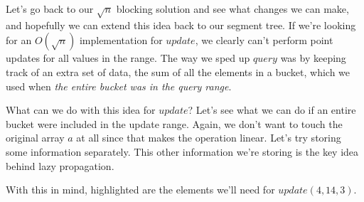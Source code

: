 \documentclass[11pt]{book}
\begin{document}
Let's go back to our $\sqrt{n}$ blocking solution and see what changes we can make, and hopefully we can extend this idea back to our segment tree. If we're looking for an $O(\sqrt{n})$ implementation for $update$, we clearly can't perform point updates for all values in the range. The way we sped up $query$ was by keeping track of an extra set of data, the sum of all the elements in a bucket, which we used when \textit{the entire bucket was in the query range}.

\begin{center}
{
}
\end{center}

What can we do with this idea for $update$? Let's see what we can do if an entire bucket were included in the update range. Again, we don't want to touch the original array $a$ at all since that makes the operation linear. Let's try storing some information separately. This other information we're storing is the key idea behind lazy propagation.

With this in mind, highlighted are the elements we'll need for $update(4,14,3)$.
\end{document}
